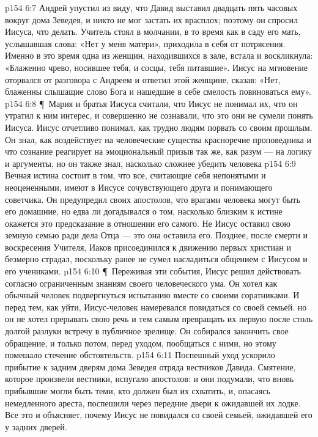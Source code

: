 \vs p154 6:7 Андрей упустил из виду, что Давид выставил двадцать пять часовых вокруг дома Зеведея, и никто не мог застать их врасплох; поэтому он спросил Иисуса, что делать. Учитель стоял в молчании, в то время как в саду его мать, услышавшая слова: «Нет у меня матери», приходила в себя от потрясения. Именно в это время одна из женщин, находившихся в зале, встала и воскликнула: «Блаженно чрево, носившее тебя, и сосцы, тебя питавшие». Иисус на мгновение оторвался от разговора с Андреем и ответил этой женщине, сказав: «Нет, блаженны слышащие слово Бога и нашедшие в себе смелость повиноваться ему».
\vs p154 6:8 \P\ Мария и братья Иисуса считали, что Иисус не понимал их, что он утратил к ним интерес, и совершенно не сознавали, что это они не сумели понять Иисуса. Иисус отчетливо понимал, как трудно людям порвать со своим прошлым. Он знал, как воздействует на человеческие существа красноречие проповедника и что сознание реагирует на эмоциональный призыв так же, как разум --- на логику и аргументы, но он также знал, насколько сложнее убедить человека 
\vs p154 6:9 Вечная истина состоит в том, что все, считающие себя непонятыми и неоцененными, имеют в Иисусе сочувствующего друга и понимающего советчика. Он предупредил своих апостолов, что врагами человека могут быть его домашние, но едва ли догадывался о том, насколько близким к истине окажется это предсказание в отношении его самого. Не Иисус оставил свою земную семью ради дела Отца --- это она оставила его. Позднее, после смерти и воскресения Учителя, Иаков присоединился к движению первых христиан и безмерно страдал, поскольку ранее не сумел насладиться общением с Иисусом и его учениками.
\vs p154 6:10 \P\ Переживая эти события, Иисус решил действовать согласно ограниченным знаниям своего человеческого ума. Он хотел как обычный человек подвергнуться испытанию вместе со своими соратниками. И перед тем, как уйти, Иисус\hyp{}человек намеревался повидаться со своей семьей. но он не хотел прерывать свою речь и тем самым превращать их первую после столь долгой разлуки встречу в публичное зрелище. Он собирался закончить свое обращение, и только потом, перед уходом, пообщаться с ними, но этому помешало стечение обстоятельств.
\vs p154 6:11 Поспешный уход ускорило прибытие к задним дверям дома Зеведея отряда вестников Давида. Смятение, которое произвели вестники, испугало апостолов: и они подумали, что вновь прибывшие могли быть теми, кто должен был их схватить, и, опасаясь немедленного ареста, поспешили через передние двери к ожидавшей их лодке. Все это и объясняет, почему Иисус не повидался со своей семьей, ожидавшей его у задних дверей.
